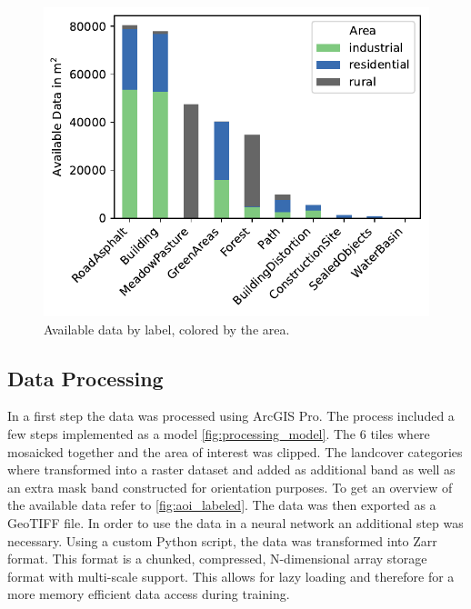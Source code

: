 \begin{figure}[H]
    \centering
    \captionsetup{width=0.8\linewidth}
    \includegraphics[scale=0.6]{figures/area_by_category.pdf}
    \caption{Available data by label, colored by the area.}
    \label{fig:landcover_categories}
\end{figure}

\subsection{Data Processing}%

In a first step the data was processed using ArcGIS Pro. The process included a few steps implemented as
a model \autoref{fig:processing_model}. The 6 tiles where mosaicked together and the area of interest 
was clipped. The landcover categories where transformed into a raster dataset and added as additional
band as well as an extra mask band constructed for orientation purposes. To get an overview of the
available data refer to \autoref{fig:aoi_labeled}. The data was then exported as a GeoTIFF file.
In order to use the data in a neural network an additional step was necessary. Using a custom Python script,
the data was transformed into Zarr format. This format is a chunked, compressed, N-dimensional array
storage format with multi-scale support. This allows for lazy loading and therefore for a more memory
efficient data access during training.

